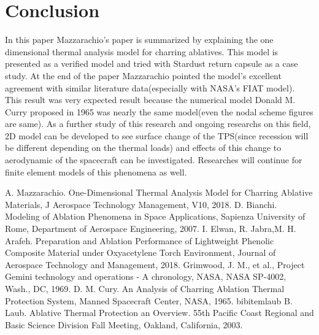\documentclass[a4paper, 12pt]{article} %
\begin{document}
\section{Conclusion}
In this paper Mazzarachio's paper\cite{mazz} is summarized by explaining the one dimensional thermal analysis model for charring ablatives. This model is presented as a verified model and tried with Stardust return capsule as a case study. At the end of the paper Mazzarachio pointed the model's excellent agreement with similar literature data(especially with NASA's FIAT model). This result was very expected result because the numerical model Donald M. Curry proposed in 1965 \cite{cury} was nearly the same model(even the nodal scheme figures are same). As a further study of this research and ongoing researchs on this field, 2D model can be developed to see surface change of the TPS(since recession will be different depending on the thermal loads) and effects of this change to aerodynamic of the spacecraft can be investigated. Researches will continue for finite element models of this phenomena as well. 
\newpage


  













\begin{thebibliography}{99}
	  A. Mazzarachio.
 One-Dimensional Thermal Analysis Model for Charring Ablative Materials,
  J Aerospace Technology Management, V10,
  2018. 
%
	  D. Bianchi. Modeling of Ablation Phenomena in Space Applications,
   Sapienza University of Rome, Department of Aerospace Engineering, 2007.
  I. Elwan, R. Jabra,M. H. Arafeh. Preparation and Ablation Performance of Lightweight Phenolic Composite Material under Oxyacetylene Torch Environment,
   Journal of Aerospace Technology and Management, 2018.
  Grimwood, J. M., et al., Project Gemini technology and operations - A chronology, NASA, NASA SP-4002, Wash., DC, 1969.
  D. M. Cury. An Analysis of Charring Ablation Thermal Protection System,
   Manned Spacecraft Center, NASA, 1965.
bibitem{laub} B. Laub. Ablative Thermal Protection an Overview. 55th Pacific Coast Regional and Basic Science Division Fall Meeting, Oakland, California, 2003.
\end{thebibliography}
\end{document}
